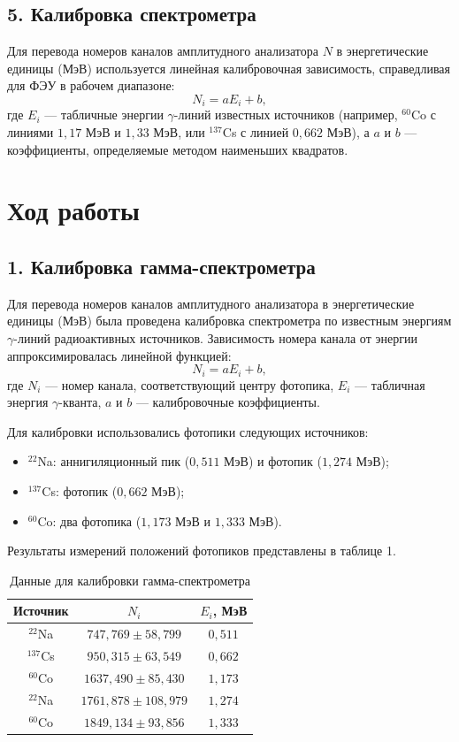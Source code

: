\documentclass[12pt,a4paper]{article}
\begin{document}
\subsection*{5. Калибровка спектрометра}
Для перевода номеров каналов амплитудного анализатора $N$ в энергетические единицы (МэВ) используется линейная калибровочная зависимость, справедливая для ФЭУ в рабочем диапазоне:
\begin{equation}
    N_i = a E_i + b,
\end{equation}
где $E_i$ --- табличные энергии $\gamma$-линий известных источников (например, $^{60}$Co с линиями $1,17$ МэВ и $1,33$ МэВ, или $^{137}$Cs с линией $0,662$ МэВ), а $a$ и $b$ --- коэффициенты, определяемые методом наименьших квадратов.


\section*{Ход работы}

\subsection*{1. Калибровка гамма-спектрометра}

Для перевода номеров каналов амплитудного анализатора в энергетические единицы (МэВ) была проведена калибровка спектрометра по известным энергиям $\gamma$-линий радиоактивных источников. Зависимость номера канала от энергии аппроксимировалась линейной функцией:
\begin{equation}
    N_i = a E_i + b,
\end{equation}
где $N_i$ --- номер канала, соответствующий центру фотопика, $E_i$ --- табличная энергия $\gamma$-кванта, $a$ и $b$ --- калибровочные коэффициенты.

Для калибровки использовались фотопики следующих источников:
\begin{itemize}
    \item $^{22}$Na: аннигиляционный пик ($0,511$ МэВ) и фотопик ($1,274$ МэВ);
    \item $^{137}$Cs: фотопик ($0,662$ МэВ);
    \item $^{60}$Co: два фотопика ($1,173$ МэВ и $1,333$ МэВ).
\end{itemize}

Результаты измерений положений фотопиков представлены в таблице 1.

\begin{table}[H]
\centering
\caption{Данные для калибровки гамма-спектрометра}
\label{tab:calibration}
\renewcommand{\arraystretch}{1.2}
\begin{tabular}{|c|c|c|}
\hline
Источник & $N_i$ & $E_i$, МэВ \\
\hline
$^{22}$Na & $747,769 \pm 58,799$ & $0,511$ \\
$^{137}$Cs & $950,315 \pm 63,549$ & $0,662$ \\
$^{60}$Co & $1637,490 \pm 85,430$ & $1,173$ \\
$^{22}$Na & $1761,878 \pm 108,979$ & $1,274$ \\
$^{60}$Co & $1849,134 \pm 93,856$ & $1,333$ \\
\hline
\end{tabular}
\end{table}
\end{document}
